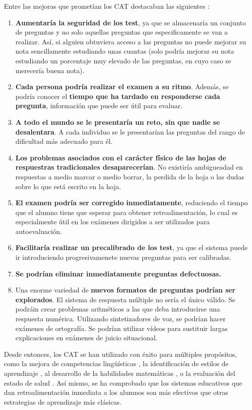 Entre las mejoras que prometían los \acrshort{CAT} destacaban las siguientes \cite{Green83}:

\begin{enumerate}
	\item \textbf{Aumentaría la seguridad de los test}, ya que se almacenaría un conjunto de preguntas y no solo aquellas preguntas que especificamente se van a realizar. Así, si alguien obtuviera acceso a las preguntas no puede mejorar su nota sencillamente estudiando unas cuantas (solo podría mejorar su nota estudiando un porcentaje muy elevado de las preguntas, en cuyo caso se merecería buena nota).
	\item \textbf{Cada persona podría realizar el examen a su ritmo}. Además, se podría conocer el \textbf{tiempo que ha tardado en responderse cada pregunta}, información que puede ser útil para evaluar.
	\item \textbf{A todo el mundo se le presentaría un reto, sin que nadie se desalentara}. A cada individuo se le presentarían las preguntas del rango de dificultad más adecuado para él.
	\item \textbf{Los problemas asociados con el carácter físico de las hojas de respuestras tradicionales desaparecerían}. No existiría ambigueadad en respuestas a medio marcar o medio borrar, la perdida de la hoja o las dudas sobre lo que está escrito en la hoja.
	\item \textbf{El examen podría ser corregido inmediatamente}, reduciendo el tiempo que el alumno tiene que esperar para obtener retroalimentación, lo cual es especialmente útil en los exámenes dirigidos a ser utilizados para autoevaluación.
	\item \textbf{Facilitaría realizar un precalibrado de los test}, ya que el sistema puede ir introduciendo progresivamenete nuevas preguntas para ser calibradas.
	\item \textbf{Se podrían eliminar inmediatamente preguntas defectuosas.}
	\item Una enorme variedad de \textbf{nuevos formatos de preguntas podrían ser explorados}. El sistema de respuesta múltiple no sería el único válido. Se podráin crear problemas aritméticos a las que deba introducirse una respuesta numérica. Utilizando sintetizadores de voz, se podrían hacer exámenes de ortografía. Se podrían utilizar vídeos para sustituir largas explicaciones en exámenes de juicio situacional.
\end{enumerate}

Desde entonces, los \acrshort{CAT} se han utilizado con éxito para múltiples propósitos, como la mejora de competencias lingüísticas \cite{Chapelle06}, la identificación de estilos de aprendizaje \cite{Ortigosa10}, al desarrollo de la habilidades matemáticas \cite{Klinkenberg11}, o la evaluación del estado de salud \cite{Revicki97}. Así mismo, se ha comprobado que los sistemas educativos que dan retroalimentación inmediata a los alumnos son más efectivos que otras estrategias de aprendizaje más clásicas\cite{Kumar04}. 

